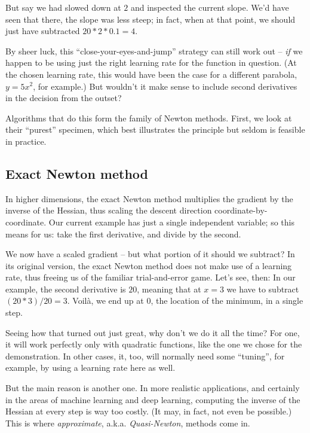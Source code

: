 \documentclass[
  letterpaper,
]{krantz}
\begin{document}
But say we had slowed down at \(2\) and inspected the current slope.
We'd have seen that there, the slope was less steep; in fact, when at
that point, we should just have subtracted \(20 * 2 * 0.1= 4\).

By sheer luck, this ``close-your-eyes-and-jump'' strategy can still work
out -- \emph{if} we happen to be using just the right learning rate for
the function in question. (At the chosen learning rate, this would have
been the case for a different parabola, \(y = 5x^2\), for example.) But
wouldn't it make sense to include second derivatives in the decision
from the outset?

Algorithms that do this form the family of Newton methods. First, we
look at their ``purest'' specimen, which best illustrates the principle
but seldom is feasible in practice.

\hypertarget{exact-newton-method}{%
\subsection{Exact Newton method}\label{exact-newton-method}}

In higher dimensions, the exact Newton method multiplies the gradient by
the inverse of the Hessian, thus scaling the descent direction
coordinate-by-coordinate. Our current example has just a single
independent variable; so this means for us: take the first derivative,
and divide by the second.

We now have a scaled gradient -- but what portion of it should we
subtract? In its original version, the exact Newton method does not make
use of a learning rate, thus freeing us of the familiar trial-and-error
game. Let's see, then: In our example, the second derivative is \(20\),
meaning that at \(x=3\) we have to subtract \((20 * 3)/20=3\). Voilà, we
end up at \(0\), the location of the minimum, in a single step.

Seeing how that turned out just great, why don't we do it all the time?
For one, it will work perfectly only with quadratic functions, like the
one we chose for the demonstration. In other cases, it, too, will
normally need some ``tuning'', for example, by using a learning rate
here as well.

But the main reason is another one. In more realistic applications, and
certainly in the areas of machine learning and deep learning, computing
the inverse of the Hessian at every step is way too costly. (It may, in
fact, not even be possible.) This is where \emph{approximate}, a.k.a.
\emph{Quasi-Newton}, methods come in.
\end{document}
